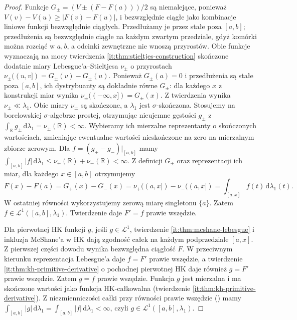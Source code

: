 \begin{proof}
Funkcje $G_\pm=(V\pm(F-F(a)))/2$ są niemalejące, ponieważ $V(v)-V(u)\ge|F(v)-F(u)|$, i bezwzględnie ciągłe jako kombinacje liniowe funkcji bezwzględnie ciągłych. Przedłużamy je przez stałe poza $[a,b]$; przedłużenia są bezwzględnie ciągłe na każdym zwartym przedziale, gdyż komórki można rozciąć w $a,b$, a odcinki zewnętrzne nie wnoszą przyrostów. Obie funkcje wyznaczają na mocy twierdzenia \ref{it:thm:stieltjes-construction} skończone dodatnie miary Lebesgue'a--Stieltjesa $\nu_\pm$ o przyrostach $\nu_\pm((u,v])=G_\pm(v)-G_\pm(u)$. Ponieważ $G_\pm(a)=0$ i przedłużenia są stałe
poza $[a,b]$, ich dystrybuanty są dokładnie równe
$G_\pm$: dla każdego $x$ z konstrukcji miar wynika
$\nu_\pm((-\infty,x])=G_\pm(x)$.
Z twierdzenia  wynika
$\nu_\pm\ll\lambda_1$. Obie miary $\nu_\pm$ są skończone, a $\lambda_1$
jest $\sigma$-skończona. Stosujemy
na borelowskiej $\sigma$-algebrze prostej, otrzymując
nieujemne gęstości $g_\pm$ z
$\int_{\mathbb R}g_\pm\,\mathrm d\lambda_1=\nu_\pm(\mathbb R)<\infty$.
Wybieramy ich mierzalne reprezentanty o skończonych wartościach,
zmieniając ewentualne wartości nieskończone na zero
na mierzalnym zbiorze zerowym.
Dla $f=(g_+-g_-)|_{[a,b]}$ mamy
$\int_{[a,b]}|f|\,\mathrm d\lambda_1
\le\nu_+(\mathbb R)+\nu_-(\mathbb R)<\infty$.
Z definicji $G_\pm$ oraz reprezentacji ich miar,
dla każdego $x\in[a,b]$ otrzymujemy
\[
 F(x)-F(a)=G_+(x)-G_-(x)
 =\nu_+((a,x])-\nu_-((a,x])
 =\int_{[a,x]}f(t)\,\mathrm d\lambda_1(t).
\]
W ostatniej równości wykorzystujemy zerową miarę
singletonu $\{a\}$. Zatem $f\in\mathcal L^1([a,b],\lambda_1)$. Twierdzenie  daje $F'=f$ prawie wszędzie.

Dla pierwotnej HK funkcji $g$, jeśli $g\in\mathcal L^1$, twierdzenie \ref{it:thm:mcshane-lebesgue} i inkluzja McShane'a w HK dają zgodność całek na każdym podprzedziale $[a,x]$. Z pierwszej części dowodu wynika bezwzględna ciągłość $F$. W przeciwnym kierunku reprezentacja Lebesgue'a daje $f=F'$ prawie wszędzie, a twierdzenie \ref{it:thm:kh-primitive-derivative} o pochodnej pierwotnej HK daje również $g=F'$ prawie wszędzie. Zatem $g=f$ prawie wszędzie. Funkcja $g$ jest mierzalna i ma skończone wartości jako funkcja HK-całkowalna (twierdzenie \ref{it:thm:kh-primitive-derivative}). Z niezmienniczości całki przy równości prawie wszędzie () mamy $\int_{[a,b]}|g|\,\mathrm d\lambda_1=\int_{[a,b]}|f|\,\mathrm d\lambda_1<\infty$, czyli $g\in\mathcal L^1([a,b],\lambda_1)$.
\end{proof}
